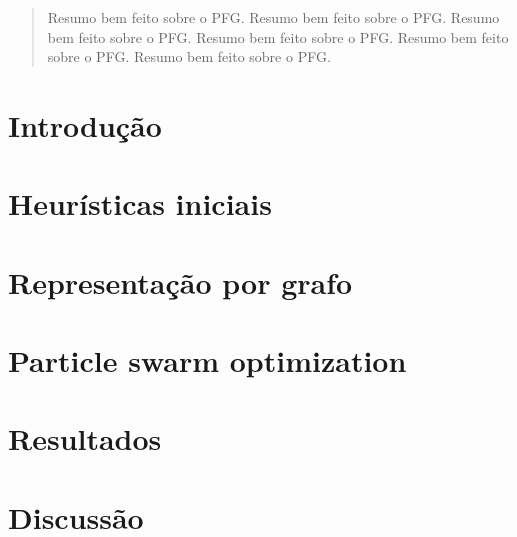 \documentclass[11pt,twoside]{article}
\begin{document}

    \begin{abstract}
        Resumo bem feito sobre o PFG. Resumo bem feito sobre o PFG. Resumo bem feito sobre o PFG. Resumo bem feito sobre o PFG. Resumo bem feito sobre o PFG. Resumo bem feito sobre o PFG.
    \end{abstract}

    \section{Introdução}

        

    \section{Heurísticas iniciais}

        

    \section{Representação por grafo}

        

    \section{Particle swarm optimization}

        

    \section{Resultados}

        

    \section{Discussão}

    \newpage
    \printbibliography
\end{document}
